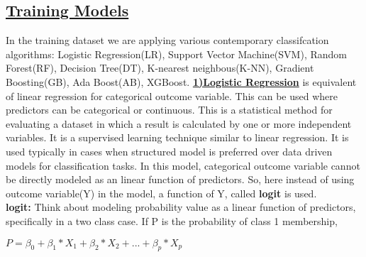 \documentclass[11pt]{article}
\begin{document}
\subsection{\underline{Training Models}}
In the training dataset we are applying various contemporary classifcation algorithms: Logistic Regression(LR), Support Vector Machine(SVM), Random Forest(RF), Decision Tree(DT), K-nearest neighbous(K-NN), Gradient Boosting(GB), Ada Boost(AB), XGBoost.
\underline{\textbf{1)Logistic Regression}} is equivalent of linear regression for categorical outcome variable. This can be used where predictors can be categorical or continuous. This is a statistical method for evaluating a dataset in which a result
is calculated by one or more independent variables. It is a supervised learning technique
similar to linear regression. It is used typically in cases when structured model is preferred over data driven models for classification tasks. In this model, categorical outcome variable cannot be directly modeled as an linear function of predictors. So, here instead of using outcome variable(Y) in the model, a function of Y, called \textbf{logit} is used. \\
\textbf{logit:} Think about modeling probability value as a linear function of predictors, specifically in a two class case. If P is the probability of class 1 membership,
\begin{center}
  $P =\beta_{0}+\beta_{1}*X_{1}+\beta_{2}*X_{2}+...+\beta_{p}*X_{p}$
\end{center}
\end{document}
